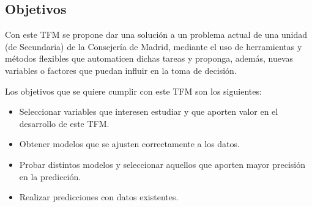 \subsection{Objetivos}
Con este TFM se propone dar una solución a un problema actual de una unidad (de Secundaria) de la Consejería de Madrid, mediante el uso de herramientas y métodos flexibles que automaticen dichas tareas y proponga, además, nuevas variables o factores que puedan influir en la toma de decisión. 

Los objetivos que se quiere cumplir con este TFM son los siguientes:
\begin{itemize}
	\item Seleccionar variables que interesen estudiar y que aporten valor en el desarrollo de este TFM.
	\item Obtener modelos que se ajusten correctamente a los datos.
	\item Probar distintos modelos y seleccionar aquellos que aporten mayor precisión en la predicción. 
	\item Realizar predicciones con datos existentes.
\end{itemize}

